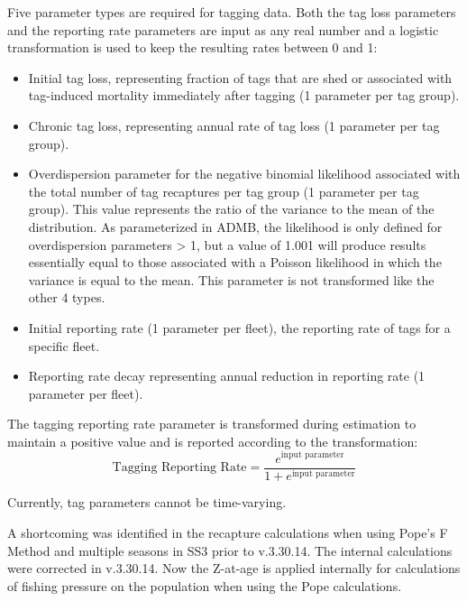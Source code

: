 Five parameter types are required for tagging data. Both the tag loss parameters and the reporting rate parameters are input as any real number and a logistic transformation is used to keep the resulting rates between 0 and 1:
\begin{itemize}
	\item Initial tag loss, representing fraction of tags that are shed or associated with tag-induced mortality immediately after tagging (1 parameter per tag group). 
	\item Chronic tag loss, representing annual rate of tag loss (1 parameter per tag group).
	\item Overdispersion parameter for the negative binomial likelihood associated with the total number of tag recaptures per tag group (1 parameter per tag group). This value represents the ratio of the variance to the mean of the distribution. As parameterized in ADMB, the likelihood is only defined for overdispersion parameters > 1, but a value of 1.001 will produce results essentially equal to those associated with a Poisson likelihood in which the variance is equal to the mean. This parameter is not transformed like the other 4 types.
	\item Initial reporting rate (1 parameter per fleet), the reporting rate of tags for a specific fleet.
	\item Reporting rate decay representing annual reduction in reporting rate (1 parameter per fleet).
\end{itemize}

The tagging reporting rate parameter is transformed during estimation to maintain a positive value and is reported according to the transformation:
\begin{equation}
	\text{Tagging Reporting Rate} = \frac{e^{\text{input parameter}}}{1+e^{\text{input parameter}}}
\end{equation}

Currently, tag parameters cannot be time-varying.

A shortcoming was identified in the recapture calculations when using Pope's F Method and multiple seasons in SS3 prior to v.3.30.14. The internal calculations were corrected in v.3.30.14. Now the Z-at-age is applied internally for calculations of fishing pressure on the population when using the Pope calculations.

